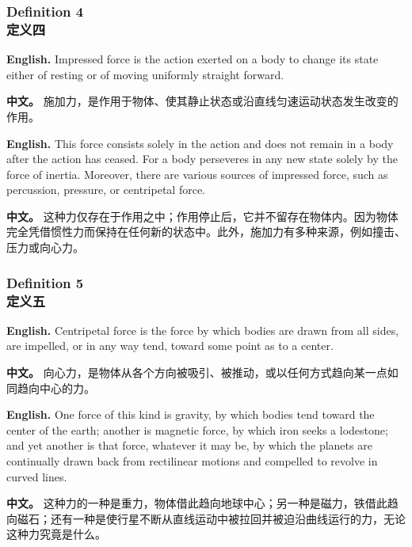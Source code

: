 \subsubsection*{Definition 4\\定义四}
\noindent\textbf{English.} Impressed force is the action exerted on a body to change its state either of resting or of moving uniformly straight forward.
\par\noindent\textbf{中文。} 施加力，是作用于物体、使其静止状态或沿直线匀速运动状态发生改变的作用。
\medskip

\noindent\textbf{English.} This force consists solely in the action and does not remain in a body after the action has ceased. For a body perseveres in any new state solely by the force of inertia. Moreover, there are various sources of impressed force, such as percussion, pressure, or centripetal force.
\par\noindent\textbf{中文。} 这种力仅存在于作用之中；作用停止后，它并不留存在物体内。因为物体完全凭借惯性力而保持在任何新的状态中。此外，施加力有多种来源，例如撞击、压力或向心力。
\medskip

\subsubsection*{Definition 5\\定义五}
\noindent\textbf{English.} Centripetal force is the force by which bodies are drawn from all sides, are impelled, or in any way tend, toward some point as to a center.
\par\noindent\textbf{中文。} 向心力，是物体从各个方向被吸引、被推动，或以任何方式趋向某一点如同趋向中心的力。
\medskip

\noindent\textbf{English.} One force of this kind is gravity, by which bodies tend toward the center of the earth; another is magnetic force, by which iron seeks a lodestone; and yet another is that force, whatever it may be, by which the planets are continually drawn back from rectilinear motions and compelled to revolve in curved lines.
\par\noindent\textbf{中文。} 这种力的一种是重力，物体借此趋向地球中心；另一种是磁力，铁借此趋向磁石；还有一种是使行星不断从直线运动中被拉回并被迫沿曲线运行的力，无论这种力究竟是什么。
\medskip

